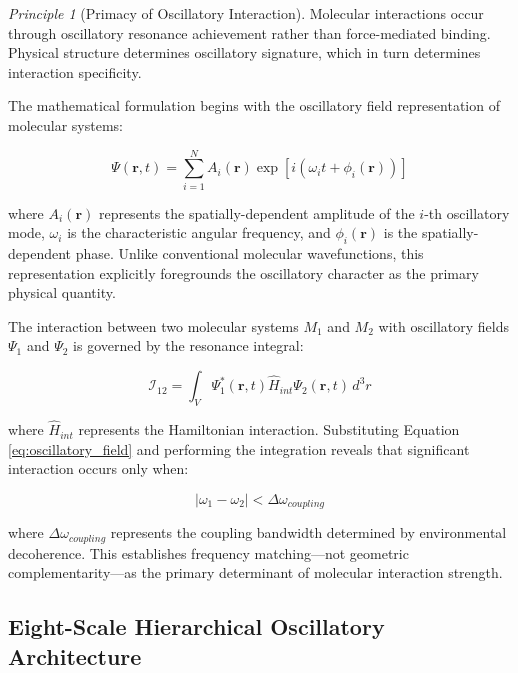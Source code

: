 \documentclass{article}
\theoremstyle{definition}
\theoremstyle{remark}
\newtheorem{principle}[theorem]{Principle}
\begin{document}
\begin{principle}[Primacy of Oscillatory Interaction]
Molecular interactions occur through oscillatory resonance achievement rather than force-mediated binding. Physical structure determines oscillatory signature, which in turn determines interaction specificity.
\end{principle}

The mathematical formulation begins with the oscillatory field representation of molecular systems:

\begin{equation}
\Psi(\mathbf{r},t) = \sum_{i=1}^{N} A_i(\mathbf{r}) \exp[i(\omega_i t + \phi_i(\mathbf{r}))]
\label{eq:oscillatory_field}
\end{equation}

where $A_i(\mathbf{r})$ represents the spatially-dependent amplitude of the $i$-th oscillatory mode, $\omega_i$ is the characteristic angular frequency, and $\phi_i(\mathbf{r})$ is the spatially-dependent phase. Unlike conventional molecular wavefunctions, this representation explicitly foregrounds the oscillatory character as the primary physical quantity.

The interaction between two molecular systems $M_1$ and $M_2$ with oscillatory fields $\Psi_1$ and $\Psi_2$ is governed by the resonance integral:

\begin{equation}
\mathcal{I}_{12} = \int_{V} \Psi_1^*(\mathbf{r},t) \hat{H}_{int} \Psi_2(\mathbf{r},t) \, d^3r
\label{eq:resonance_integral}
\end{equation}

where $\hat{H}_{int}$ represents the Hamiltonian interaction. Substituting Equation \ref{eq:oscillatory_field} and performing the integration reveals that significant interaction occurs only when:

\begin{equation}
|\omega_1 - \omega_2| < \Delta\omega_{coupling}
\label{eq:resonance_condition}
\end{equation}

where $\Delta\omega_{coupling}$ represents the coupling bandwidth determined by environmental decoherence. This establishes frequency matching—not geometric complementarity—as the primary determinant of molecular interaction strength.


\subsection{Eight-Scale Hierarchical Oscillatory Architecture}
\end{document}
